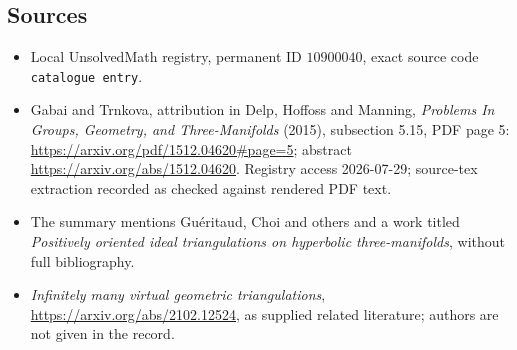 \documentclass[11pt]{article}
\begin{document}
\subsection{Sources}
\begin{itemize}
\item Local UnsolvedMath registry, permanent ID \(10900040\), exact source code \texttt{catalogue entry}.
\item Gabai and Trnkova, attribution in Delp, Hoffoss and Manning, \emph{Problems In Groups, Geometry, and Three-Manifolds} (2015), subsection 5.15, PDF page 5: \url{https://arxiv.org/pdf/1512.04620#page=5}; abstract \url{https://arxiv.org/abs/1512.04620}. Registry access 2026-07-29; source-tex extraction recorded as checked against rendered PDF text.
\item The summary mentions Gu\'eritaud, Choi and others and a work titled \emph{Positively oriented ideal triangulations on hyperbolic three-manifolds}, without full bibliography.
\item \emph{Infinitely many virtual geometric triangulations}, \url{https://arxiv.org/abs/2102.12524}, as supplied related literature; authors are not given in the record.
\end{itemize}
\end{document}
